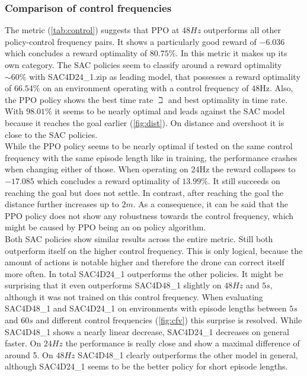 
\newpage




\subsubsection{Comparison of control frequencies}
The metric (\cref{tab:control}) suggests that PPO at $48Hz$ outperforms all other policy-control frequency pairs. 
It shows a particularly good reward of $-6.036$ which concludes a reward optimality of $80.75 \%$. 
In this metric it makes up its own category. 
The SAC policies seem to classify around a reward optimality $\sim 60 \%$ with SAC4D24\_1.zip as leading model, 
that possesses a reward optimality of $66.54 \%$ on an environment operating with a control frequency of 48Hz. 
Also, the PPO policy shows the best time rate $\beth$ and best optimality in time rate. 
With $98.01 \%$ it seems to be nearly optimal and leads against the SAC model because it reaches the goal earlier (\cref{fig:dist}). 
On distance and overshoot it is close to the SAC policies.\\
While the PPO policy seems to be nearly optimal if tested on the same control frequency with the same episode length like in training, 
the performance crashes when changing either of those. 
When operating on 24Hz the reward collapses to $-17.085$ which concludes a reward optimality of $13.99 \%$.
It still succeeds on reaching the goal but does not settle. In contrast, after reaching the goal the distance further increases up to $2m$. 
As a consequence, it can be said that the PPO policy does not show any robustness towards the control frequency, 
which might be caused by PPO being an on policy algorithm.\\
Both SAC policies show similar results across the entire metric. 
Still both outperform itself on the higher control frequency. 
This is only logical, because the amount of actions is notable higher and therefore the drone can correct itself more often. 
In total SAC4D24\_1 outperforms the other policies. It might be surprising that it even outperforms
 SAC4D48\_1 slightly on $48Hz$ and $5s$, although it was not trained on this control frequency.  
When evaluating SAC4D48\_1 and SAC4D24\_1 on environments with episode lengths between $5s$ and $60s$ and different control
 frequencies (\cref{fig:cfv}) this surprise is resolved. While SAC4D48\_1 shows a nearly linear decrease, SAC4D24\_1 decreases on general faster. 
 On $24Hz$ the performance is really close and show a maximal difference of around 5. 
 On $48Hz$ SAC4D48\_1 clearly outperforms the other model in general, although SAC4D24\_1 seems to be the better policy for short episode lengths.

